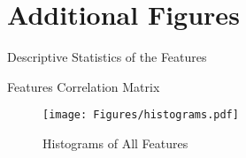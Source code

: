 \chapter{Additional Figures}
\label{chap:additional_figures} 
 
\begin{table}
	\resizebox{\textwidth}{!}{}
	\caption{Descriptive Statistics of the Features}
	\label{tab:descriptives}
\end{table} 
 
\begin{sidewaystable}
	\begin{adjustbox}{scale=0.4,center}
		
	\end{adjustbox}
	\caption{Features Correlation Matrix}
	\label{tab:correlation_matrix}
\end{sidewaystable}


\begin{center}
	\begin{figure}
		\texttt{[image: Figures/histograms.pdf]}
		\caption{Histograms of All Features}
		\label{fig:histograms}
	\end{figure}
\end{center}
